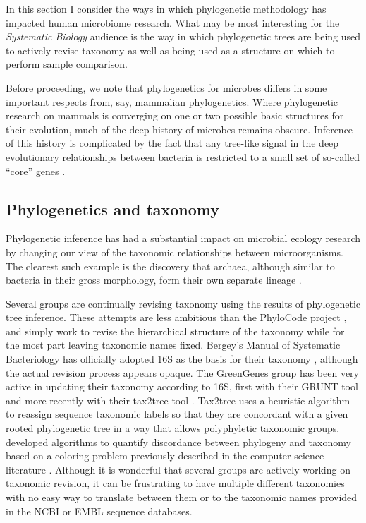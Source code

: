 \documentclass{amsart}
\begin{document}
In this section I consider the ways in which phylogenetic methodology has impacted human microbiome research.
What may be most interesting for the \textit{Systematic Biology} audience is the way in which phylogenetic trees are being used to actively revise taxonomy as well as being used as a structure on which to perform sample comparison.

Before proceeding, we note that phylogenetics for microbes differs in some important respects from, say, mammalian phylogenetics.
Where phylogenetic research on mammals is converging on one or two possible basic structures for their evolution, much of the deep history of microbes remains obscure.
Inference of this history is complicated by the fact that any tree-like signal in the deep evolutionary relationships between bacteria is restricted to a small set of so-called ``core'' genes \citep{bapteste2009prokaryotic,Leigh2011-zu,Lang2013-zt}.

\subsection{Phylogenetics and taxonomy}

Phylogenetic inference has had a substantial impact on microbial ecology research by changing our view of the taxonomic relationships between microorganisms.
The clearest such example is the discovery that archaea, although similar to bacteria in their gross morphology, form their own separate lineage \citep{woese1977phylogenetic}.

Several groups are continually revising taxonomy using the results of phylogenetic tree inference.
These attempts are less ambitious than the PhyloCode project \citep[to develop a taxonomic scheme expressed directly in terms of a phylogeny; see][]{forey2001phylocode}, and simply work to revise the hierarchical structure of the taxonomy while for the most part leaving taxonomic names fixed.
Bergey's Manual of Systematic Bacteriology has officially adopted 16S as the basis for their taxonomy \citep{kreig1984bergey}, although the actual revision process appears opaque.
The GreenGenes group \citep{desantis2006greengenes} has been very active in updating their taxonomy according to 16S, first with their GRUNT tool \citep{dalevi2007automated} and more recently with their tax2tree tool \citep{mcdonald2011improved}.
Tax2tree uses a heuristic algorithm to reassign sequence taxonomic labels so that they are concordant with a given rooted phylogenetic tree in a way that allows polyphyletic taxonomic groups.
\citet{matsen2012reconciling} developed algorithms to quantify discordance between phylogeny and taxonomy based on a coloring problem previously described in the computer science literature \citep{moran2008convex}.
Although it is wonderful that several groups are actively working on taxonomic revision, it can be frustrating to have multiple different taxonomies with no easy way to translate between them or to the taxonomic names provided in the NCBI or EMBL sequence databases.
\end{document}
